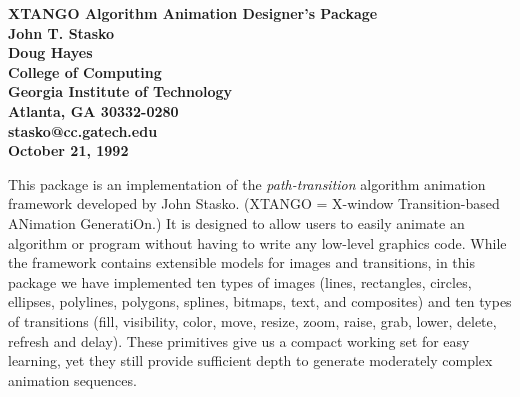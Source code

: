 
\textheight 9in
\textwidth 6.5in
\topmargin -0.25in
\oddsidemargin 0.0in
\evensidemargin 0.0in



\pagestyle{myheadings}
\thispagestyle{empty}

\begin{center}
   \Large\bf  XTANGO Algorithm Animation Designer's Package\\[.2in]
\large  John T. Stasko                 \\
        Doug Hayes               \\[.2in]
        College of Computing \\
        Georgia Institute of Technology\\
        Atlanta, GA  30332-0280     \\[.2in]
        stasko@cc.gatech.edu        \\[.1in]
        October 21, 1992
\end{center}
This package is an implementation of the {\em path-transition}
algorithm animation framework developed by John Stasko.  (XTANGO =
X-window Transition-based ANimation GeneratiOn.)  It is designed to
allow users to easily animate an algorithm or program without having
to write any low-level graphics code.  While the framework contains
extensible models for images and transitions, in this package we have
implemented ten types of images (lines, rectangles, circles, ellipses,
polylines, polygons, splines, bitmaps, text, and composites) and ten
types of transitions (fill, visibility, color, move, resize, zoom, raise,
grab, lower, delete, refresh and delay). These primitives give us a
compact working set for easy learning, yet they still provide
sufficient depth to generate moderately complex animation sequences.

